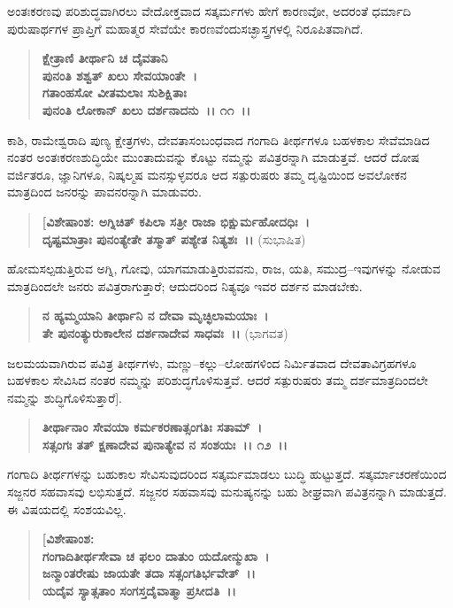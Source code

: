 ಅಂತಃಕರಣವು ಪರಿಶುದ್ಧವಾಗಿರಲು ವೇದೋಕ್ತವಾದ ಸತ್ಕರ್ಮಗಳು ಹೇಗೆ ಕಾರಣವೋ, ಅದರಂತೆ ಧರ್ಮಾದಿ ಪುರುಷಾರ್ಥಗಳ ಪ್ರಾಪ್ತಿಗೆ ಮಹಾತ್ಮರ ಸೇವೆಯೇ ಕಾರಣವೆಂದು\break ಸಚ್ಛಾಸ್ತ್ರಗಳಲ್ಲಿ ನಿರೂಪಿತವಾಗಿದೆ.

\begin{verse}
\textbf{ಕ್ಷೇತ್ರಾಣಿ ತೀರ್ಥಾನಿ ಚ ದೈವತಾನಿ} \\\textbf{ಪುನಂತಿ ಶಶ್ವತ್ ಖಲು ಸೇವಯಾಂತೇ~।}\\\textbf{ಗತಾಂಹಸೋ ವೀತಮಲಾಃ ಸುಶಿಕ್ಷಿತಾಃ} \\\textbf{ಪುನಂತಿ ಲೋಕಾನ್ ಖಲು ದರ್ಶನಾದನು~।। ೧೧~।।}
\end{verse}

ಕಾಶಿ, ರಾಮೇಶ್ವರಾದಿ ಪುಣ್ಯ ಕ್ಷೇತ್ರಗಳು, ದೇವತಾಸಂಬಂಧವಾದ ಗಂಗಾದಿ ತೀರ್ಥಗಳೂ ಬಹಳಕಾಲ ಸೇವೆಮಾಡಿದ ನಂತರ ಅಂತಃಕರಣಶುದ್ಧಿಯೇ ಮುಂತಾದುವನ್ನು ಕೊಟ್ಟು ನಮ್ಮನ್ನು ಪವಿತ್ರರನ್ನಾಗಿ ಮಾಡುತ್ತವೆ. ಆದರೆ ದೋಷ ವರ್ಜಿತರೂ, ಜ್ಞಾನಿಗಳೂ, ನಿಷ್ಕಲ್ಮಷ ಮನಸ್ಸುಳ್ಳವರೂ ಆದ ಸತ್ಪುರುಷರು ತಮ್ಮ ದೃಷ್ಟಿಯಿಂದ ಅವಲೋಕನ ಮಾತ್ರದಿಂದ ಜನರನ್ನು ಪಾವನರನ್ನಾಗಿ ಮಾಡುವರು.

\begin{verse}
\textbf{[ವಿಶೇಷಾಂಶ: ಅಗ್ನಿಚಿತ್ ಕಪಿಲಾ ಸತ್ರೀ ರಾಜಾ ಭಿಕ್ಷುರ್ಮಹೋದಧಿಃ~।}\\\textbf{ದೃಷ್ಟಮಾತ್ರಾಃ ಪುನಂತ್ಯೇತೇ ತಸ್ಮಾತ್ ಪಶ್ಯೇತ ನಿತ್ಯಶಃ~।।} (ಸುಭಾಷಿತ)
\end{verse}

ಹೋಮಸಲ್ಪಡುತ್ತಿರುವ ಅಗ್ನಿ, ಗೋವು, ಯಾಗಮಾಡುತ್ತಿರುವವನು, ರಾಜ, ಯತಿ, ಸಮುದ್ರ–ಇವುಗಳನ್ನು ನೋಡುವ ಮಾತ್ರದಿಂದಲೇ ಜನರು ಪವಿತ್ರರಾಗುತ್ತಾರೆ; ಆದುದರಿಂದ ನಿತ್ಯವೂ ಇವರ ದರ್ಶನ ಮಾಡಬೇಕು.

\begin{verse}
\textbf{ನ ಹ್ಯಮ್ಮಯಾನಿ ತೀರ್ಥಾನಿ ನ ದೇವಾ ಮೃಚ್ಛಿಲಾಮಯಾಃ~।}\\\textbf{ತೇ ಪುನಂತ್ಯುರುಕಾಲೇನ ದರ್ಶನಾದೇವ ಸಾಧವಃ~।।} (ಭಾಗವತ)
\end{verse}

ಜಲಮಯವಾಗಿರುವ ಪವಿತ್ರ ತೀರ್ಥಗಳು, ಮಣ್ಣು–ಕಲ್ಲು–ಲೋಹಗಳಿಂದ ನಿರ್ಮಿತವಾದ ದೇವತಾವಿಗ್ರಹಗಳೂ ಬಹಳಕಾಲ ಸೇವಿಸಿದ ನಂತರ ನಮ್ಮನ್ನು ಪರಿಶುದ್ಧಗೊಳಿಸುತ್ತವೆ. ಆದರೆ ಸತ್ಪುರುಷರು ತಮ್ಮ ದರ್ಶಮಾತ್ರದಿಂದಲೇ ನಮ್ಮನ್ನು ಶುದ್ಧಿಗೊಳಿಸುತ್ತಾರೆ].

\begin{verse}
\textbf{ತೀರ್ಥಾನಾಂ ಸೇವಯಾ ಕರ್ಮಕರಣಾತ್ಸಂಗತಿಃ ಸತಾಮ್~।}\\\textbf{ಸತ್ಸಂಗಃ ತತ್ ಕ್ಷಣಾದೇವ ಪುನಾತ್ಯೇವ ನ ಸಂಶಯಃ~।। ೧೨~।।}
\end{verse}

ಗಂಗಾದಿ ತೀರ್ಥಗಳನ್ನು ಬಹುಕಾಲ ಸೇವಿಸುವುದರಿಂದ ಸತ್ಕರ್ಮಮಾಡಲು ಬುದ್ಧಿ ಹುಟ್ಟುತ್ತದೆ. ಸತ್ಕರ್ಮಾಚರಣೆಯಿಂದ ಸಜ್ಜನರ ಸಹವಾಸವು ಲಭಿಸುತ್ತದೆ. ಸಜ್ಜನರ ಸಹವಾಸವು ಮನುಷ್ಯನನ್ನು ಬಹು ಶೀಘ್ರವಾಗಿ ಪವಿತ್ರನನ್ನಾಗಿ ಮಾಡುತ್ತದೆ. ಈ ವಿಷಯದಲ್ಲಿ ಸಂಶಯವಿಲ್ಲ.

\begin{verse}
\textbf{[ವಿಶೇಷಾಂಶ:}\\\textbf{ಗಂಗಾದಿತೀರ್ಥಸೇವಾ ಚ ಫಲಂ ದಾತುಂ ಯದೋನ್ಮುಖಾ~।}\\\textbf{ಜನ್ಮಾಂತರೇಷು ಜಾಯತೇ ತದಾ ಸತ್ಸಂಗತಿರ್ಭವೇತ್~।।}\\\textbf{ಯದೈವ ಸ್ಯಾತ್ಸತಾಂ ಸಂಗಸ್ತದೈವಾತ್ಮಾ ಪ್ರಸೀದತಿ~।।}  
\end{verse}

